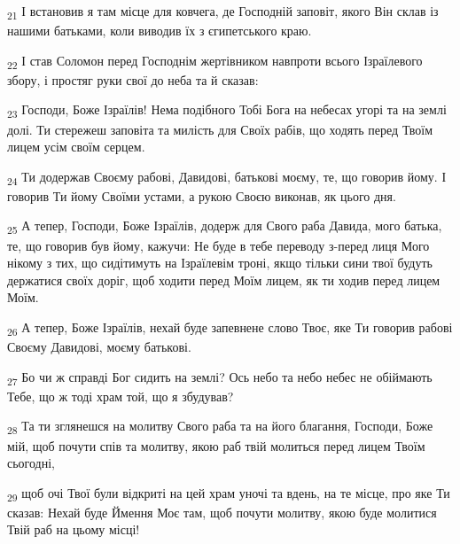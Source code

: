 \begin{tcolorbox}
\textsubscript{21} І встановив я там місце для ковчега, де Господній заповіт, якого Він склав із нашими батьками, коли виводив їх з єгипетського краю.
\end{tcolorbox}
\begin{tcolorbox}
\textsubscript{22} І став Соломон перед Господнім жертівником навпроти всього Ізраїлевого збору, і простяг руки свої до неба та й сказав:
\end{tcolorbox}
\begin{tcolorbox}
\textsubscript{23} Господи, Боже Ізраїлів! Нема подібного Тобі Бога на небесах угорі та на землі долі. Ти стережеш заповіта та милість для Своїх рабів, що ходять перед Твоїм лицем усім своїм серцем.
\end{tcolorbox}
\begin{tcolorbox}
\textsubscript{24} Ти додержав Своєму рабові, Давидові, батькові моєму, те, що говорив йому. І говорив Ти йому Своїми устами, а рукою Своєю виконав, як цього дня.
\end{tcolorbox}
\begin{tcolorbox}
\textsubscript{25} А тепер, Господи, Боже Ізраїлів, додерж для Свого раба Давида, мого батька, те, що говорив був йому, кажучи: Не буде в тебе переводу з-перед лиця Мого нікому з тих, що сидітимуть на Ізраїлевім троні, якщо тільки сини твої будуть держатися своїх доріг, щоб ходити перед Моїм лицем, як ти ходив перед лицем Моїм.
\end{tcolorbox}
\begin{tcolorbox}
\textsubscript{26} А тепер, Боже Ізраїлів, нехай буде запевнене слово Твоє, яке Ти говорив рабові Своєму Давидові, моєму батькові.
\end{tcolorbox}
\begin{tcolorbox}
\textsubscript{27} Бо чи ж справді Бог сидить на землі? Ось небо та небо небес не обіймають Тебе, що ж тоді храм той, що я збудував?
\end{tcolorbox}
\begin{tcolorbox}
\textsubscript{28} Та ти зглянешся на молитву Свого раба та на його благання, Господи, Боже мій, щоб почути спів та молитву, якою раб твій молиться перед лицем Твоїм сьогодні,
\end{tcolorbox}
\begin{tcolorbox}
\textsubscript{29} щоб очі Твої були відкриті на цей храм уночі та вдень, на те місце, про яке Ти сказав: Нехай буде Ймення Моє там, щоб почути молитву, якою буде молитися Твій раб на цьому місці!
\end{tcolorbox}
